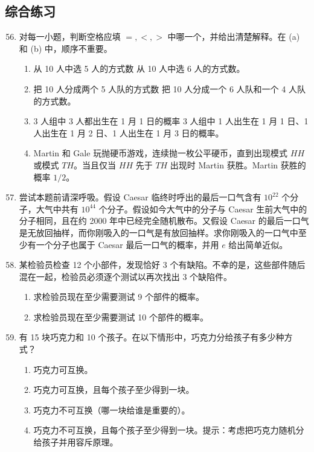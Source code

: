 \documentclass[UTF8,12pt,a4paper,fontset=fandol]{ctexart}
\begin{document}
\subsection*{综合练习}

\begin{enumerate}
  \setcounter{enumi}{55}
  \item 对每一小题，判断空格应填 $=,<,>$ 中哪一个，并给出清楚解释。在 (a) 和 (b) 中，顺序不重要。
  \begin{enumerate}
    \item 从 10 人中选 5 人的方式数 \underline{\hspace{1cm}} 从 10 人中选 6 人的方式数。
    \item 把 10 人分成两个 5 人队的方式数 \underline{\hspace{1cm}} 把 10 人分成一个 6 人队和一个 4 人队的方式数。
    \item 3 人组中 3 人都出生在 1 月 1 日的概率 \underline{\hspace{1cm}} 3 人组中 1 人出生在 1 月 1 日、1 人出生在 1 月 2 日、1 人出生在 1 月 3 日的概率。
    \item Martin 和 Gale 玩抛硬币游戏，连续抛一枚公平硬币，直到出现模式 $HH$ 或模式 $TH$。当且仅当 $HH$ 先于 $TH$ 出现时 Martin 获胜。Martin 获胜的概率 \underline{\hspace{1cm}} $1/2$。
  \end{enumerate}

  \item 尝试本题前请深呼吸。假设 Caesar 临终时呼出的最后一口气含有 $10^{22}$ 个分子，大气中共有 $10^{44}$ 个分子。假设如今大气中的分子与 Caesar 生前大气中的分子相同，且在约 2000 年中已经完全随机散布。又假设 Caesar 的最后一口气是无放回抽样，而你刚吸入的一口气是有放回抽样。求你刚吸入的一口气中至少有一个分子也属于 Caesar 最后一口气的概率，并用 $e$ 给出简单近似。

  \item 某检验员检查 12 个小部件，发现恰好 3 个有缺陷。不幸的是，这些部件随后混在一起，检验员必须逐个测试以再次找出 3 个缺陷件。
  \begin{enumerate}
    \item 求检验员现在至少需要测试 9 个部件的概率。
    \item 求检验员现在至少需要测试 10 个部件的概率。
  \end{enumerate}

  \item 有 15 块巧克力和 10 个孩子。在以下情形中，巧克力分给孩子有多少种方式？
  \begin{enumerate}
    \item 巧克力可互换。
    \item 巧克力可互换，且每个孩子至少得到一块。
    \item 巧克力不可互换（哪一块给谁是重要的）。
    \item 巧克力不可互换，且每个孩子至少得到一块。提示：考虑把巧克力随机分给孩子并用容斥原理。
  \end{enumerate}


\end{enumerate}
\end{document}
